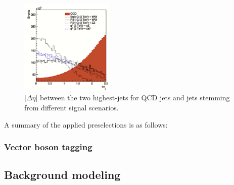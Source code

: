 \begin{figure}[htb]
\centering
\includegraphics[width=0.4\textwidth]{figures/analysis/search1/misc/deta_opt.png}
\caption{ $|\Delta\eta|$  between the two highest-\PT jets for QCD jets and jets stemming from different signal scenarios.}
\label{fig:searchI:detaopt}
\end{figure}
 

A summary of the applied preselections is as follows:

\subsubsection{Vector boson tagging}

\subsection{Background modeling}
\label{sec:searchI:bkg}


